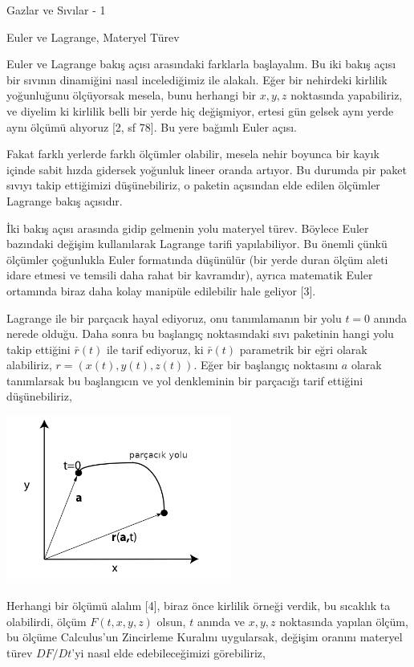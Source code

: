 \documentclass[12pt,fleqn]{article}\usepackage{../../common}
\begin{document}
Gazlar ve Sıvılar - 1

Euler ve Lagrange, Materyel Türev

Euler ve Lagrange bakış açısı arasındaki farklarla başlayalım. Bu iki bakış
açısı bir sıvının dinamiğini nasıl incelediğimiz ile alakalı. Eğer bir nehirdeki
kirlilik yoğunluğunu ölçüyorsak mesela, bunu herhangi bir $x,y,z$ noktasında
yapabiliriz, ve diyelim ki kirlilik belli bir yerde hiç değişmiyor, ertesi gün
gelsek aynı yerde aynı ölçümü alıyoruz [2, sf 78]. Bu yere bağımlı Euler açısı.

Fakat farklı yerlerde farklı ölçümler olabilir, mesela nehir boyunca bir kayık
içinde sabit hızda gidersek yoğunluk lineer oranda artıyor. Bu durumda pir paket
sıvıyı takip ettiğimizi düşünebiliriz, o paketin açısından elde edilen ölçümler
Lagrange bakış açısıdır. 

İki bakış açısı arasında gidip gelmenin yolu materyel türev. Böylece Euler
bazındaki değişim kullanılarak Lagrange tarifi yapılabiliyor. Bu önemli çünkü
ölçümler çoğunlukla Euler formatında düşünülür (bir yerde duran ölçüm aleti
idare etmesi ve temsili daha rahat bir kavramdır), ayrıca matematik Euler
ortamında biraz daha kolay manipüle edilebilir hale geliyor [3].

Lagrange ile bir parçacık hayal ediyoruz, onu tanımlamanın bir yolu $t=0$ anında
nerede olduğu. Daha sonra bu başlangıç noktasındaki sıvı paketinin hangi yolu
takip ettiğini $\bar{r}(t)$ ile tarif ediyoruz, ki $\bar{r}(t)$ parametrik bir
eğri olarak alabiliriz, $r = ( x(t), y(t), z(t) )$. Eğer bir başlangıç
noktasını $a$ olarak tanımlarsak bu başlangıcın ve yol denkleminin bir parçacığı
tarif ettiğini düşünebiliriz,

\includegraphics[width=20em]{phy_050_cons_02.png}

Herhangi bir ölçümü alalım [4], biraz önce kirlilik örneği verdik, bu
sıcaklık ta olabilirdi, ölçüm $F(t,x,y,z)$ olsun, $t$ anında ve $x,y,z$
noktasında yapılan ölçüm, bu ölçüme Calculus'un Zincirleme Kuralını uygularsak,
değişim oranını materyel türev $D F / Dt$'yi nasıl elde edebileceğimizi
görebiliriz,
\end{document}
